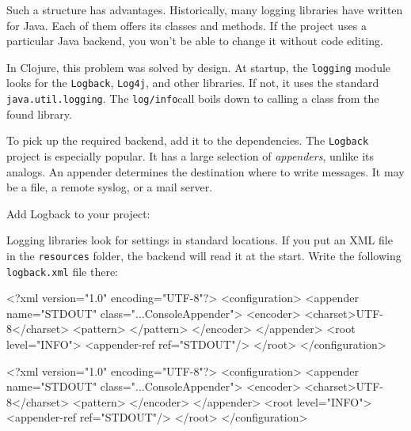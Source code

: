 Such a structure has advantages. Historically, many logging libraries have written for Java. Each of them offers its classes and methods. If the project uses a particular Java backend, you won't be able to change it without code editing.


In Clojure, this problem was solved by design. At startup, the \verb|logging| module looks for the \verb|Logback|, \verb|Log4j|, and other libraries. If not, it uses the standard \verb|java.util.logging|. The \verb|log/info|call boils down to calling a class from the found library.

To pick up the required backend, add it to the dependencies. The \verb|Logback| project is especially popular. It has a large selection of \emph{appenders}, unlike its analogs. An appender determines the destination where to write messages. It may be a file, a remote syslog, or a mail server.

Add Logback to your project:

\begin{clojure}
\end{clojure}


Logging libraries look for settings in standard locations. If you put an XML file in the \verb|resources| folder, the backend will read it at the start. Write the following \verb|logback.xml| file there:

\ifx\DEVICETYPE\MOBILE

\begin{xml}
<?xml version="1.0" encoding="UTF-8"?>
<configuration>
  <appender name="STDOUT"
    class="...ConsoleAppender">
    <encoder>
      <charset>UTF-8</charset>
      <pattern>
      </pattern>
    </encoder>
  </appender>
  <root level="INFO">
    <appender-ref ref="STDOUT"/>
  </root>
</configuration>
\end{xml}

\else

\begin{xml}
<?xml version="1.0" encoding="UTF-8"?>
<configuration>
  <appender name="STDOUT" class="...ConsoleAppender">
    <encoder>
      <charset>UTF-8</charset>
      <pattern>%
    </encoder>
  </appender>
  <root level="INFO">
    <appender-ref ref="STDOUT"/>
  </root>
</configuration>
\end{xml}

